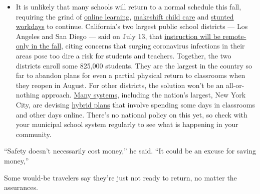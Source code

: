 \begin{itemize}
  \begin{itemize}
  \tightlist
  \item
    It is unlikely that many schools will return to a normal schedule
    this fall, requiring the grind of
    \href{https://www.nytimes3xbfgragh.onion/2020/06/05/us/coronavirus-education-lost-learning.html?action=click\&pgtype=Article\&state=default\&region=MAIN_CONTENT_3\&context=storylines_faq}{online
    learning},
    \href{https://www.nytimes3xbfgragh.onion/2020/05/29/us/coronavirus-child-care-centers.html?action=click\&pgtype=Article\&state=default\&region=MAIN_CONTENT_3\&context=storylines_faq}{makeshift
    child care} and
    \href{https://www.nytimes3xbfgragh.onion/2020/06/03/business/economy/coronavirus-working-women.html?action=click\&pgtype=Article\&state=default\&region=MAIN_CONTENT_3\&context=storylines_faq}{stunted
    workdays} to continue. California's two largest public school
    districts --- Los Angeles and San Diego --- said on July 13, that
    \href{https://www.nytimes3xbfgragh.onion/2020/07/13/us/lausd-san-diego-school-reopening.html?action=click\&pgtype=Article\&state=default\&region=MAIN_CONTENT_3\&context=storylines_faq}{instruction
    will be remote-only in the fall}, citing concerns that surging
    coronavirus infections in their areas pose too dire a risk for
    students and teachers. Together, the two districts enroll some
    825,000 students. They are the largest in the country so far to
    abandon plans for even a partial physical return to classrooms when
    they reopen in August. For other districts, the solution won't be an
    all-or-nothing approach.
    \href{https://bioethics.jhu.edu/research-and-outreach/projects/eschool-initiative/school-policy-tracker/}{Many
    systems}, including the nation's largest, New York City, are
    devising
    \href{https://www.nytimes3xbfgragh.onion/2020/06/26/us/coronavirus-schools-reopen-fall.html?action=click\&pgtype=Article\&state=default\&region=MAIN_CONTENT_3\&context=storylines_faq}{hybrid
    plans} that involve spending some days in classrooms and other days
    online. There's no national policy on this yet, so check with your
    municipal school system regularly to see what is happening in your
    community.
  \end{itemize}
\end{itemize}

``Safety doesn't necessarily cost money,'' he said. ``It could be an
excuse for saving money,''

Some would-be travelers say they're just not ready to return, no matter
the assurances.

